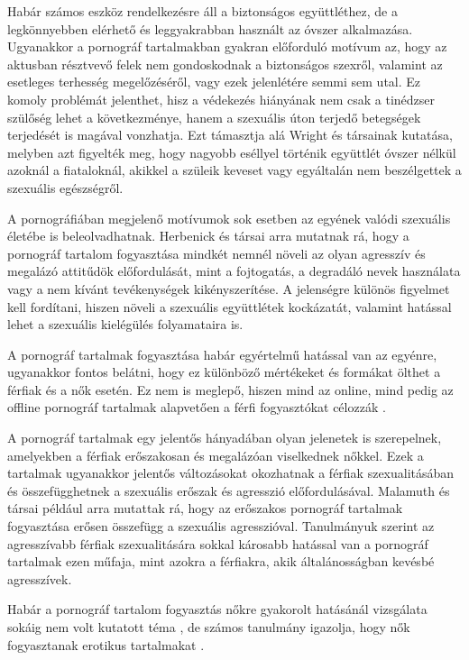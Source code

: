 \documentclass[12pt,a4paper]{article}
\begin{document}
Habár számos eszköz rendelkezésre áll a biztonságos együttléthez, de a legkönnyebben elérhető és leggyakrabban használt az óvszer alkalmazása. Ugyanakkor a pornográf tartalmakban gyakran előforduló motívum az, hogy az aktusban résztvevő felek nem gondoskodnak a biztonságos szexről, valamint az esetleges terhesség megelőzéséről, vagy ezek jelenlétére semmi sem utal.  Ez komoly problémát jelenthet, hisz a védekezés hiányának nem csak a tinédzser szülőség lehet a következménye, hanem a szexuális úton terjedő betegségek terjedését is magával vonzhatja. Ezt támasztja alá Wright és társainak \citeyearpar{wright2020adolescent} kutatása, melyben azt figyelték meg, hogy nagyobb eséllyel történik együttlét óvszer nélkül azoknál a fiataloknál, akikkel a szüleik keveset vagy egyáltalán nem beszélgettek a szexuális egészségről.

A pornográfiában megjelenő motívumok sok esetben az egyének valódi szexuális életébe is beleolvadhatnak. Herbenick és társai \citeyearpar{herbenick2020diverse} arra mutatnak rá, hogy a pornográf tartalom fogyasztása mindkét nemnél növeli az olyan agresszív és megalázó attitűdök előfordulását, mint a fojtogatás, a degradáló nevek használata vagy a nem kívánt tevékenységek kikényszerítése. A jelenségre különös figyelmet kell fordítani, hiszen növeli a szexuális együttlétek kockázatát, valamint hatással lehet a szexuális kielégülés folyamataira is.

A pornográf tartalmak fogyasztása habár egyértelmű hatással van az egyénre, ugyanakkor fontos belátni, hogy ez különböző mértékeket és formákat ölthet a férfiak és a nők esetén. Ez nem is meglepő, hiszen mind az online, mind pedig az offline pornográf tartalmak alapvetően a férfi fogyasztókat célozzák \citep{boies2002university}.

A pornográf tartalmak egy jelentős hányadában olyan jelenetek is szerepelnek, amelyekben a férfiak erőszakosan és megalázóan viselkednek nőkkel. Ezek a tartalmak ugyanakkor jelentős változásokat okozhatnak a férfiak szexualitásában és összefügghetnek a szexuális erőszak és agresszió előfordulásával. Malamuth és társai \citeyearpar{malamuth2000pornography} például arra mutattak rá, hogy az erőszakos pornográf tartalmak fogyasztása erősen összefügg a szexuális agresszióval. Tanulmányuk szerint az agresszívabb férfiak szexualitására sokkal károsabb hatással van a pornográf tartalmak ezen műfaja, mint azokra a férfiakra, akik általánosságban kevésbé agresszívek.

Habár a pornográf tartalom fogyasztás nőkre gyakorolt hatásánál vizsgálata sokáig nem volt kutatott téma \citep{weinberg2010pornography}, de számos tanulmány igazolja, hogy nők fogyasztanak erotikus tartalmakat \citep{sabina2008nature}.
\end{document}
